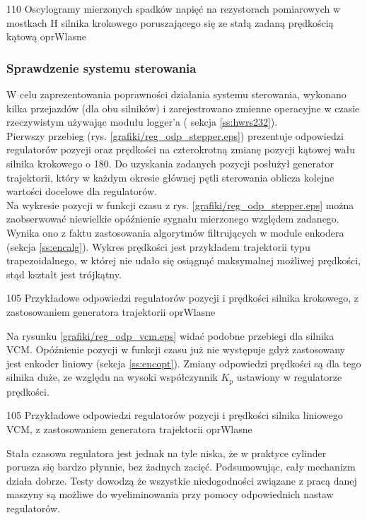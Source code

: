 	{110}
	{Oscylogramy mierzonych spadków napięć na rezystorach pomiarowych w mostkach H silnika krokowego poruszającego się ze stałą zadaną prędkością kątową}
	{oprWlasne}
	
\clearpage
	
\subsubsection{Sprawdzenie systemu sterowania}

W celu zaprezentowania poprawności działania systemu sterowania, wykonano kilka przejazdów (dla obu silników) i zarejestrowano zmienne operacyjne w czasie rzeczywistym używając modułu logger'a ( sekcja \ref{ss:hwrs232}). \\

Pierwszy przebieg (rys. \ref{grafiki/reg_odp_stepper.eps}) prezentuje odpowiedzi regulatorów pozycji oraz prędkości na czterokrotną zmianę pozycji kątowej wału silnika krokowego o 180\degree. Do uzyskania zadanych pozycji posłużył generator trajektorii, który w każdym okresie głównej pętli sterowania oblicza kolejne wartości docelowe dla regulatorów. \\
 
Na wykresie pozycji w funkcji czasu z rys. \ref{grafiki/reg_odp_stepper.eps} można zaobserwować niewielkie opóźnienie sygnału mierzonego względem zadanego. Wynika ono z faktu zastosowania algorytmów filtrujących w module enkodera (sekcja \ref{ss:encalg}). Wykres prędkości jest przykładem trajektorii typu trapezoidalnego, w której nie udało się osiągnąć maksymalnej możliwej prędkości, stąd kształt jest trójkątny.

	{105}
	{Przykładowe odpowiedzi regulatorów pozycji i prędkości silnika krokowego, z zastosowaniem generatora trajektorii}
	{oprWlasne}
	
Na rysunku \ref{grafiki/reg_odp_vcm.eps} widać podobne przebiegi dla silnika VCM. Opóźnienie pozycji w funkcji czasu już nie występuje gdyż zastosowany jest enkoder liniowy (sekcja \ref{ss:encopt}). Zmiany odpowiedzi prędkości są dla tego silnika duże, ze względu na wysoki współczynnik $ K_p $ ustawiony w regulatorze prędkości.

\clearpage
	
	{105}
	{Przykładowe odpowiedzi regulatorów pozycji i prędkości silnika liniowego VCM, z zastosowaniem generatora trajektorii}
	{oprWlasne}
	
Stała czasowa regulatora jest jednak na tyle niska, że w praktyce cylinder porusza się bardzo płynnie, bez żadnych zacięć. Podsumowując, cały mechanizm działa dobrze. Testy dowodzą że wszystkie niedogodności związane z pracą danej maszyny są możliwe do wyeliminowania przy pomocy odpowiednich nastaw regulatorów.


